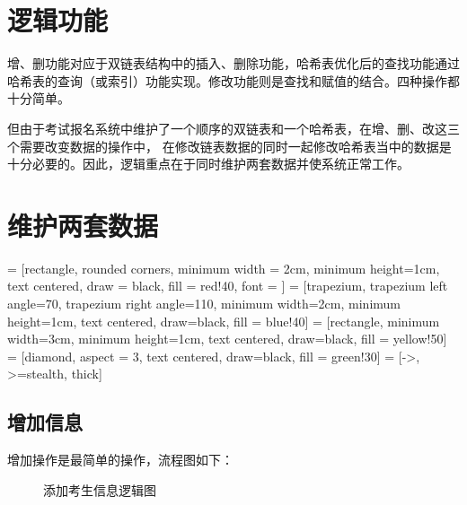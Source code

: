\vspace*{1.0cm}

\section{逻辑功能}
{\kaishu 增、删}功能对应于双链表结构中的{\kaishu 插入、删除}功能，哈希表优化后的{\kaishu 查找}功能通过%
哈希表的{\kaishu 查询（或索引）}功能实现。{\kaishu 修改}功能则是查找和赋值的结合。四种操作都十分简单。

但由于考试报名系统中维护了一个顺序的双链表和一个哈希表，在{\kaishu 增、删、改}这三个需要改变数据的操作中，%
在修改链表数据的{\kaishu 同时}一起修改哈希表当中的数据是十分必要的。因此，逻辑重点在于同时维护两套数据并使系统正常工作。

\section{维护两套数据}

 = [rectangle, rounded corners, minimum width = 2cm, 
        minimum height=1cm, text centered, draw = black, fill = red!40,
        font = {\bfseries}]
     = [trapezium, trapezium left angle=70, trapezium right angle=110, 
    minimum width=2cm, minimum height=1cm, text centered, draw=black, fill = blue!40]
     = [rectangle, minimum width=3cm, minimum height=1cm, text centered, draw=black, fill = yellow!50]
     = [diamond, aspect = 3, text centered, draw=black, fill = green!30]
     = [->, >=stealth, thick]

\subsection{增加信息}
增加操作是最简单的操作，流程图如下：
{
    \begin{figure}[H]
        \centering
        \caption{添加考生信息逻辑图\label{add}}
    \end{figure}
}


